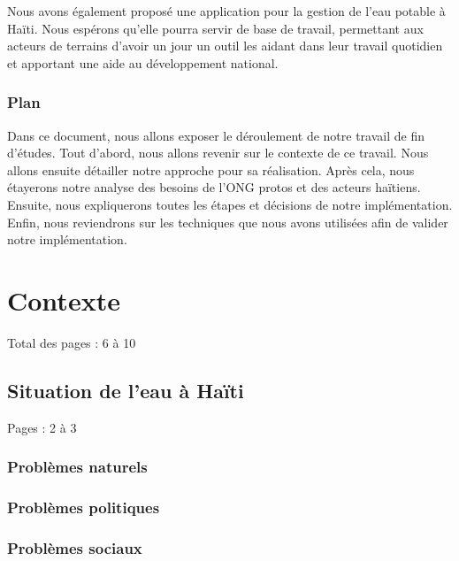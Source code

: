 \documentclass{eplmastersthesis_FR}
\begin{document}
			Nous avons également proposé une application pour la gestion de l'eau potable à Haïti. Nous espérons qu'elle pourra servir de base de travail, permettant aux acteurs de terrains d'avoir un jour un outil les aidant dans leur travail quotidien et apportant une aide au développement national.


		\subsection*{Plan}

			Dans ce document, nous allons exposer le déroulement de notre travail de fin d'études. Tout d'abord, nous allons revenir sur le contexte de ce travail. Nous allons ensuite détailler notre approche pour sa réalisation. Après cela, nous étayerons notre analyse des besoins de l'ONG protos et des acteurs haïtiens. Ensuite, nous expliquerons toutes les étapes et décisions de notre implémentation. Enfin, nous reviendrons sur les techniques que nous avons utilisées afin de valider notre implémentation.


	\chapter{Contexte}

		Total des pages : 6 à 10

		\section{Situation de l'eau à Haïti}

			Pages : 2 à 3

			\subsection*{Problèmes naturels}
			\subsection*{Problèmes politiques}
			\subsection*{Problèmes sociaux}
\end{document}
